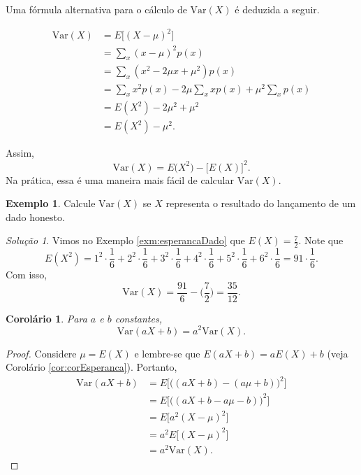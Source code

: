 \documentclass[]{book}
\newtheorem{corollary}{Corolário}[chapter]
\theoremstyle{definition}
\theoremstyle{definition}
\newtheorem{example}{Exemplo}[chapter]
\theoremstyle{definition}
\theoremstyle{remark}
\newtheorem*{solution}{Solução}
\begin{document}
Uma fórmula alternativa para o cálculo de \(\mathrm{Var}(X)\) é deduzida a seguir.

\begin{align}
\mathrm{Var}(X) &= E\big[(X-\mu)^2\big] \\
&= \sum_x (x-\mu)^2p(x) \\
&= \sum_x (x^2 - 2\mu x + \mu^2)p(x)\\
&= \sum_x x^2p(x) - 2\mu\sum_x xp(x) + \mu^2\sum_x p(x)\\
&= E(X^2) - 2\mu^2 + \mu^2\\
&= E(X^2) - \mu^2.
\end{align}

Assim,
\[\mathrm{Var}(X) = E\big(X^2\big)-\big[E(X)\big]^2.\]
Na prática, essa é uma maneira mais fácil de calcular \(\mathrm{Var}(X)\).

\begin{example}
\protect\hypertarget{exm:unnamed-chunk-178}{}{\label{exm:unnamed-chunk-178} }Calcule \(\mathrm{Var}(X)\) se \(X\) representa o resultado do lançamento de um dado honesto.
\end{example}

\begin{solution}
\iffalse{} {Solução. } \fi{}Vimos no Exemplo \ref{exm:esperancaDado} que \(E(X) =\frac{7}{2}\).
Note que
\[E(X^2) = 1^2\cdot \frac{1}{6} +2^2\cdot \frac{1}{6}+3^2\cdot \frac{1}{6}+4^2\cdot \frac{1}{6}+5^2\cdot \frac{1}{6}+6^2\cdot \frac{1}{6}=91\cdot\frac{1}{6}.\]
Com isso,
\[\mathrm{Var}(X) = \frac{91}{6} - \bigg(\frac{7}{2}\bigg) = \frac{35}{12}.\]
\end{solution}

\begin{corollary}
\protect\hypertarget{cor:unnamed-chunk-180}{}{\label{cor:unnamed-chunk-180} }Para \(a\) e \(b\) constantes, \[\mathrm{Var}(aX+b) = a^2\mathrm{Var}(X).\]
\end{corollary}

\begin{proof}
\iffalse{} {Prova. } \fi{}Considere \(\mu=E(X)\) e lembre-se que \(E(aX+b)=aE(X)+b\) (veja Corolário \ref{cor:corEsperanca}).
Portanto,
\begin{align}
\mathrm{Var}(aX+b) &= E\bigg[\big((aX+b)-(a\mu+b)\big)^2\bigg] \\
&= E\bigg[\big((aX+b-a\mu-b)\big)^2\bigg] \\
&= E\big[a^2(X-\mu)^2\big] \\
&= a^2 E\big[(X-\mu)^2\big] \\
&= a^2 \mathrm{Var}(X).
\end{align}
\end{proof}
\end{document}
